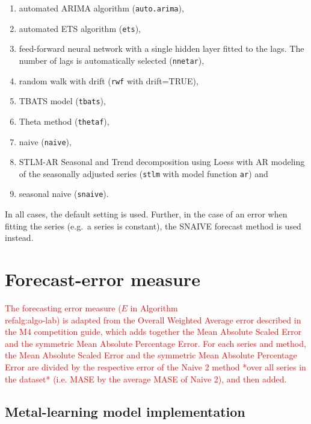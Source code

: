 \documentclass[11pt,a4paper,]{article}
\theoremstyle{definition}
\theoremstyle{definition}
\theoremstyle{definition}
\theoremstyle{remark}
\begin{document}
\begin{enumerate}
\def\labelenumi{\roman{enumi})}
\item
  automated ARIMA algorithm (\texttt{auto.arima}),
\item
  automated ETS algorithm (\texttt{ets}),
\item
  feed-forward neural network with a single hidden layer fitted to the
  lags. The number of lags is automatically selected (\texttt{nnetar}),
\item
  random walk with drift (\texttt{rwf} with drift=TRUE),
\item
  TBATS model (\texttt{tbats}),
\item
  Theta method (\texttt{thetaf}),
\item
  naive (\texttt{naive}),
\item
  STLM-AR Seasonal and Trend decomposition using Loess with AR modeling
  of the seasonally adjusted series (\texttt{stlm} with model function
  \texttt{ar}) and
\item
  seasonal naive (\texttt{snaive}).
\end{enumerate}

In all cases, the default setting is used. Further, in the case of an
error when fitting the series (e.g.~a series is constant), the SNAIVE
forecast method is used instead.

\section{Forecast-error measure}

\textcolor{red}{
The forecasting error measure ($E$ in Algorithm \\ref{alg:algo-lab}) is adapted from the Overall Weighted Average error described in the M4 competition guide, which adds together the Mean Absolute Scaled Error and the symmetric Mean Absolute Percentage Error. For each series and method, the Mean Absolute Scaled Error and the symmetric Mean Absolute Percentage Error are divided by the respective error of the Naive 2 method *over all series in the dataset* (i.e. MASE by the average MASE of Naive 2), and then added.
}

\subsection{Metal-learning model
implementation}\label{metal-learning-model-implementation}

\end{document}
